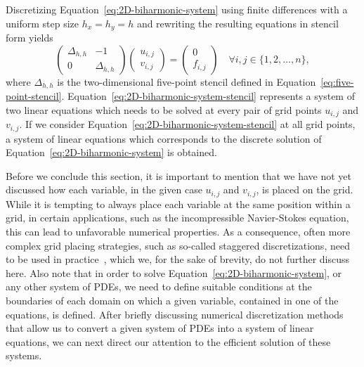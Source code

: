 Discretizing Equation~\eqref{eq:2D-biharmonic-system} using finite differences with a uniform step size $h_x = h_y = h$ and rewriting the resulting equations in stencil form yields
\begin{equation}
		\begin{pmatrix}
			\Delta_{h, h} & -1 \\
			0 & \Delta_{h, h}
	\end{pmatrix}
		\begin{pmatrix}
			u_{i,j} \\ v_{i,j}
		\end{pmatrix}
	=
		\begin{pmatrix}
			0 \\ f_{i,j}
		\end{pmatrix} \quad
\forall i,j \in \{1, 2, \dots, n\},
	\label{eq:2D-biharmonic-system-stencil}
\end{equation}
where $\Delta_{h,h}$ is the two-dimensional five-point stencil defined in Equation~\eqref{eq:five-point-stencil}.
Equation~\eqref{eq:2D-biharmonic-system-stencil} represents a system of two linear equations which needs to be solved at every pair of grid points $u_{i,j}$ and $v_{i,j}$.
If we consider Equation~\eqref{eq:2D-biharmonic-system-stencil} at all grid points, a system of linear equations which corresponds to the discrete solution of Equation~\eqref{eq:2D-biharmonic-system} is obtained.

Before we conclude this section, it is important to mention that we have not yet discussed how each variable, in the given case $u_{i,j}$ and $v_{i,j}$, is placed on the grid.
While it is tempting to always place each variable at the same position within a grid, in certain applications, such as the incompressible Navier-Stokes equation, this can lead to unfavorable numerical properties.
As a consequence, often more complex grid placing strategies, such as so-called staggered discretizations, need to be used in practice~\cite{trottenberg2000multigrid}, which we, for the sake of brevity, do not further discuss here.
Also note that in order to solve Equation~\eqref{eq:2D-biharmonic-system}, or any other system of PDEs, we need to define suitable conditions at the boundaries of each domain on which a given variable, contained in one of the equations, is defined.
After briefly discussing numerical discretization methods that allow us to convert a given system of PDEs into a system of linear equations, we can next direct our attention to the efficient solution of these systems.


